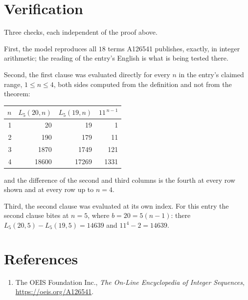 \documentclass[11pt,a4paper]{article}
\theoremstyle{plain}
\theoremstyle{definition}
\begin{document}
\section{Verification}

Three checks, each independent of the proof above.

First, the model reproduces all $18$ terms A126541 publishes, exactly, in integer
arithmetic; the reading of the entry's English is what is being tested there.

Second, the first clause was evaluated directly for every $n$ in the entry's claimed range,
$1\le n\le4$, both sides computed from the definition and not from the theorem:

\begin{center}
\begin{tabular}{rrrr}
$n$ & $L_{5}(20,n)$ & $L_{5}(19,n)$ & $11^{\,n-1}$ \\ \hline
1 & 20 & 19 & 1 \\
2 & 190 & 179 & 11 \\
3 & 1870 & 1749 & 121 \\
4 & 18600 & 17269 & 1331 \\
\end{tabular}
\end{center}

\noindent and the difference of the second and third columns is the fourth at every row shown
and at every row up to $n=4$.

Third, the second clause was evaluated at its own index. For this entry the second clause bites at $n=5$, where $b=20=5(n-1)$: there $L_{5}(20,5)-L_{5}(19,5)=14639$ and $11^{4}-2=14639$.

\section*{References}
\begin{enumerate}
\item The OEIS Foundation Inc., \emph{The On-Line Encyclopedia of Integer Sequences},
\url{https://oeis.org/A126541}.
\end{enumerate}
\end{document}
